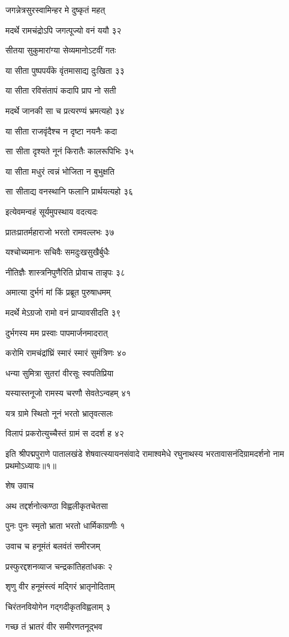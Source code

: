 जगन्नेत्रसुरस्वामिन्हर मे दुष्कृतं महत्

मदर्थे रामचंद्रोऽपि जगत्पूज्यो वनं ययौ ३२

सीतया सुकुमारांग्या सेव्यमानोऽटवीं गतः

या सीता पुष्पपर्यंके वृंतमासाद्य दुःखिता ३३

या सीता रविसंतापं कदापि प्राप नो सती

मदर्थे जानकी सा च प्रत्यरण्यं भ्रमत्यहो ३४

या सीता राजवृंदैश्च न दृष्टा नयनैः कदा

सा सीता दृश्यते नूनं किरातैः कालरूपिभिः ३५

या सीता मधुरं त्वन्नं भोजिता न बुभुक्षति

सा सीताद्य वनस्थानि फलानि प्रार्थयत्यहो ३६

इत्येवमन्वहं सूर्यमुपस्थाय वदत्यदः

प्रातःप्रातर्महाराजो भरतो रामवल्लभः ३७

यश्चोच्यमानः सचिवैः समदुःखसुखैर्बुधैः

नीतिज्ञैः शास्त्रनिपुणैरिति प्रोवाच तान्नृपः ३८

अमात्या दुर्भगं मां किं प्रब्रूत पुरुषाधमम्

मदर्थे मेऽग्रजो रामो वनं प्राप्यावसीदति ३९

दुर्भगस्य मम प्रस्वाः पापमार्जनमादरात्

करोमि रामचंद्रांघ्रिं स्मारं स्मारं सुमंत्रिणः ४०

धन्या सुमित्रा सुतरां वीरसूः स्वपतिप्रिया

यस्यास्तनूजो रामस्य चरणौ सेवतेऽन्वहम् ४१

यत्र ग्रामे स्थितो नूनं भरतो भ्रातृवत्सलः

विलापं प्रकरोत्युच्चैस्तं ग्रामं स ददर्श ह ४२

इति श्रीपद्मपुराणे पातालखंडे शेषवात्स्यायनसंवादे रामाश्वमेधे रघुनाथस्य भरतावासनंदिग्रामदर्शनो नाम प्रथमोऽध्यायः॥१॥


शेष उवाच

अथ तद्दर्शनोत्कण्ठा विह्वलीकृतचेतसा

पुनः पुनः स्मृतो भ्राता भरतो धार्मिकाग्रणीः १

उवाच च हनूमंतं बलवंतं समीरजम्

प्रस्फुरद्दशनव्याज चन्द्रकांतिहतांधकः २

शृणु वीर हनूमंस्त्वं मद्गिरं भ्रातृनोदिताम्

चिरंतनवियोगेन गद्गदीकृतविह्वलाम् ३

गच्छ तं भ्रातरं वीर समीरणतनूद्भव

